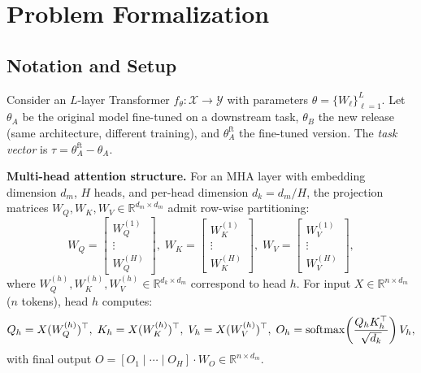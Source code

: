 \section{Problem Formalization}
\label{sec:formalization}

\subsection{Notation and Setup}

Consider an $L$-layer Transformer $f_\theta: \mathcal{X} \to \mathcal{Y}$ with parameters $\theta = \{W_\ell\}_{\ell=1}^{L}$. Let $\theta_A$ be the original model fine-tuned on a downstream task, $\theta_B$ the new release (same architecture, different training), and $\theta_A^{\text{ft}}$ the fine-tuned version. The \emph{task vector} is $\tau = \theta_A^{\text{ft}} - \theta_A$.

\medskip\noindent\textbf{Multi-head attention structure.} For an MHA layer with embedding dimension $d_m$, $H$ heads, and per-head dimension $d_k = d_m/H$, the projection matrices $W_Q, W_K, W_V \in \mathbb{R}^{d_m \times d_m}$ admit row-wise partitioning:
\begin{equation}\label{eq:head-partition}
    W_Q = \begin{bmatrix} W_Q^{(1)} \\ \vdots \\ W_Q^{(H)} \end{bmatrix},\;
    W_K = \begin{bmatrix} W_K^{(1)} \\ \vdots \\ W_K^{(H)} \end{bmatrix},\;
    W_V = \begin{bmatrix} W_V^{(1)} \\ \vdots \\ W_V^{(H)} \end{bmatrix},
\end{equation}
where $W_Q^{(h)}, W_K^{(h)}, W_V^{(h)} \in \mathbb{R}^{d_k \times d_m}$ correspond to head $h$. For input $X \in \mathbb{R}^{n \times d_m}$ ($n$ tokens), head $h$ computes:
\begin{equation}\label{eq:mha-head}
    Q_h = X (W_Q^{(h)})^\top,\; K_h = X (W_K^{(h)})^\top,\; V_h = X (W_V^{(h)})^\top,\;
    O_h = \operatorname{softmax}\!\left(\frac{Q_h K_h^\top}{\sqrt{d_k}}\right) V_h,
\end{equation}
with final output $O = [O_1 \mid \cdots \mid O_H] \cdot W_O \in \mathbb{R}^{n \times d_m}$.

